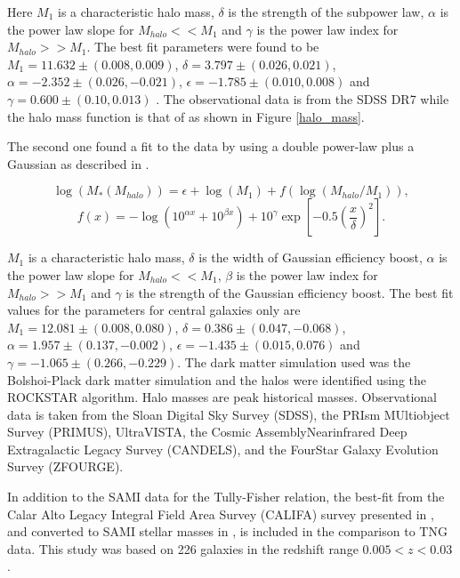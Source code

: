 Here $M_1$ is a characteristic halo mass, $\delta$ is the strength of the subpower law, $\alpha$ is the power law slope for $M_{halo} << M_1$ and $\gamma$ is the power law index for $M_{halo} >> M_1$.  The best fit parameters were found to be $M_1 = 11.632\pm(0.008, 0.009)$, $\delta = 3.797 \pm (0.026, 0.021)$, $\alpha = -2.352 \pm (0.026, -0.021)$, $\epsilon = -1.785 \pm (0.010, 0.008)$  and $\gamma = 0.600 \pm (0.10, 0.013)$ \parencite{Zanisi2019}. The observational data is from the SDSS DR7 \parencite{Abazajian2009} while the halo mass function is that of \textcite{Tinker2008} as shown in Figure \ref{halo_mass}.

The second one found a fit to the data by using a double power-law plus a Gaussian as described in \textcite{Behroozi2019}.

\begin{equation} \label{eq_behroozi}
    \log(M_*(M_{halo})) = \epsilon + \log(M_1) + f(\log(M_{halo}/M_1)),
\end{equation}
\begin{equation*}
    f(x) = -\log(10^{\alpha x}+10^{\beta x})+ 10^\gamma \exp[-0.5 (\frac{x}{\delta})^2].
\end{equation*}

$M_1$ is a characteristic halo mass, $\delta$ is the width of Gaussian efficiency boost, $\alpha$ is the power law slope for $M_{halo} << M_1$, $\beta$ is the power law index for $M_{halo} >> M_1$ and $\gamma$ is the strength of the Gaussian efficiency boost. The best fit values for the parameters for central galaxies only are $M_1 = 12.081\pm(0.008, 0.080)$, $\delta = 0.386 \pm (0.047, -0.068)$, $\alpha = 1.957 \pm (0.137, -0.002)$, $\epsilon = -1.435 \pm (0.015, 0.076)$ and $\gamma = -1.065 \pm (0.266, -0.229)$. The dark matter simulation used was the Bolshoi-Plack dark matter simulation and the halos were identified using the ROCKSTAR algorithm. Halo masses are peak historical masses. Observational data is taken from the Sloan Digital Sky Survey (SDSS), the PRIsm MUltiobject Survey (PRIMUS), UltraVISTA, the Cosmic AssemblyNearinfrared Deep Extragalactic Legacy Survey (CANDELS), and the FourStar Galaxy Evolution Survey (ZFOURGE).

In addition to the SAMI data for the Tully-Fisher relation, the best-fit from the Calar Alto Legacy Integral Field Area Survey (CALIFA) survey presented in \textcite{Bekerait2016}, and converted to SAMI stellar masses in \textcite{Bloom2017}, is included in the comparison to TNG data. This study was based on 226 galaxies in the redshift range $0.005 < z < 0.03$.


